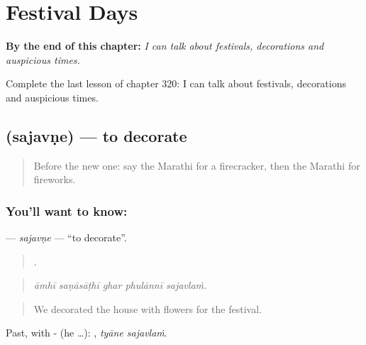 
\chapter{Festival Days}
\label{ch:mr-festival-days}

\begin{chapteropening}
\textbf{By the end of this chapter:} \emph{I can talk about festivals, decorations and auspicious times.}

Complete the last lesson of chapter 320: I can talk about festivals, decorations and auspicious times.
\end{chapteropening}

\section[\texorpdfstring{\mr{सजवणे} (sajavṇe)}{सजवणे (sajavṇe)}]{ (sajavṇe) — to decorate}

\label{lesson:MR-C320-sajavne}



\begin{quote}
Before the new one: say the Marathi for a firecracker, then the Marathi for fireworks.
\end{quote}

\subsection*{You'll want to know: }
\textbf{} — \emph{sajavṇe} — \textquotedblleft{}to decorate\textquotedblright{}.

\begin{quote}
    .
\end{quote}

\begin{quote}
\emph{āmhī saṇāsāṭhī ghar phulānnī sajavlaṁ.}
\end{quote}

\begin{quote}
We decorated the house with flowers for the festival.
\end{quote}

Past, with - (he …):  , \emph{tyāne sajavlaṁ}.

